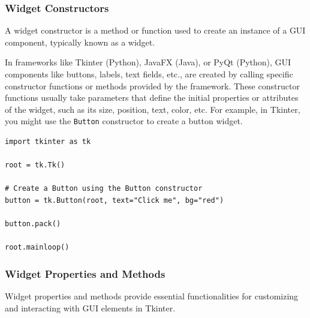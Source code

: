 \subsubsection{Widget Constructors}
A widget constructor is a method or function used to create an instance of a GUI component, typically known as a widget.

In frameworks like Tkinter (Python), JavaFX (Java), or PyQt (Python), GUI components like buttons, labels, text fields, etc., are created by calling specific constructor functions or methods provided by the framework. These constructor functions usually take parameters that define the initial properties or attributes of the widget, such as its size, position, text, color, etc. For example, in Tkinter, you might use the \texttt{Button} constructor to create a button widget.

\begin{codebox}
\begin{verbatim}
import tkinter as tk

root = tk.Tk()

# Create a Button using the Button constructor
button = tk.Button(root, text="Click me", bg="red")

button.pack()

root.mainloop()
\end{verbatim}
\end{codebox}

\newpage
\subsubsection{Widget Properties and Methods}
Widget properties and methods provide essential functionalities for customizing and interacting with GUI elements in Tkinter.


